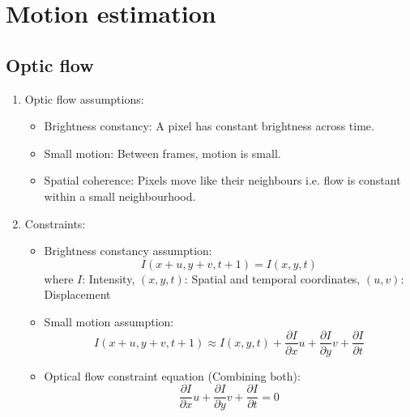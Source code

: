 \documentclass[9pt]{article}
\begin{document}
\begin{multicols*}{2}
\begin{enumerate}
    \end{enumerate}

    \section{Motion estimation}
    \subsection{Optic flow}
    \begin{enumerate}
        \item Optic flow assumptions:
        \begin{itemize}
            \item Brightness constancy: A pixel has constant brightness across time.
            \item Small motion: Between frames, motion is small.
            \item Spatial coherence: Pixels move like their neighbours i.e. flow is constant within a small neighbourhood.
        \end{itemize}

        \item Constraints:
        \begin{itemize}
            \item Brightness constancy assumption: 
            $$
                I(x + u,y + v,t + 1) = I(x,y,t)
            $$
            where $I$: Intensity, $(x,y,t)$: Spatial and temporal coordinates, $(u,v)$: Displacement

            \item Small motion assumption:
            $$
                I(x+u,y+v,t+1) \approx I(x,y,t) + \frac{\partial I}{\partial x}u + \frac{\partial I}{\partial y}v + \frac{\partial I}{\partial t}
            $$

            \item Optical flow constraint equation (Combining both): 
            $$
                \frac{\partial I}{\partial x}u + \frac{\partial I}{\partial y}v + \frac{\partial I}{\partial t} = 0
            $$
        \end{itemize}
    \end{enumerate}


\end{multicols*}
\end{document}
